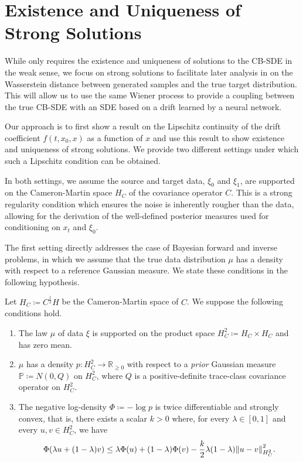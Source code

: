
\section{Existence and Uniqueness of Strong Solutions}
While  only requires the existence and uniqueness of solutions to the CB-SDE in the weak sense, we focus on strong solutions to facilitate later analysis in  on the Wasserstein distance between generated samples and the true target distribution. This will allow us to use the same Wiener process to provide a coupling between the true CB-SDE with an SDE based on a drift learned by a neural network.

Our approach is to first show a result on the Lipschitz continuity of the drift coefficient \(f(t, x_{0}, x)\) as a function of \(x\) and use this result to show existence and uniqueness of strong solutions. We provide two different settings under which such a Lipschitz condition can be obtained.

In both settings, we assume the source and target data, \(\xi_{0}\) and \(\xi_{1}\), are supported on the Cameron-Martin space \(H_{C}\) of the covariance operator \(C\). This is a strong regularity condition which ensures the noise is inherently rougher than the data, allowing for the derivation of the well-defined posterior measures used for conditioning on \(x_{t}\) and \(\xi_{0}\).

The first setting directly addresses the case of Bayesian forward and inverse problems, in which we assume that the true data distribution \(\mu\) has a density with respect to a reference Gaussian measure. We state these conditions in the following hypothesis.

\begin{hypothesis}\label{hyp:bayes}
  Let \(H_{C} \coloneqq C^{\frac{1}{2}}H\) be the Cameron-Martin space of \(C\). We suppose the following conditions hold.
  \begin{enumerate}[label=\roman*]
    \item \label{hyp1.1} The law \(\mu\) of data \(\xi\) is supported on the product space \(H_{C}^{2} \coloneqq H_{C} \times H_{C} \) and has zero mean.
    \item \label{hyp1.2} \(\mu\) has a density \(p : H^{2}_{C} \to \mathbb{R}_{\geq 0}\) with respect to a \textit{prior} Gaussian measure \(\mathbb{P} \coloneqq N(0, Q)\) on \(H^{2}_{C}\), where \(Q\) is a positive-definite trace-class covariance operator on \(H_{C}^{2}\).
    \item \label{hyp1.3} The negative log-density \(\Phi \coloneqq - \log p\) is twice differentiable and strongly convex, that is, there exists a scalar \(k > 0\) where, for every \(\lambda \in [0, 1]\) and every \(u, v \in H^{2}_{C}\), we have
      \[
        \Phi(\lambda u + (1 - \lambda)v) \leq \lambda \Phi(u) + (1 - \lambda) \Phi(v) - \frac{k}{2}\lambda(1-\lambda) \norm{u - v}^{2}_{H^{2}_{C}}.
      \]
  \end{enumerate}
\end{hypothesis}

